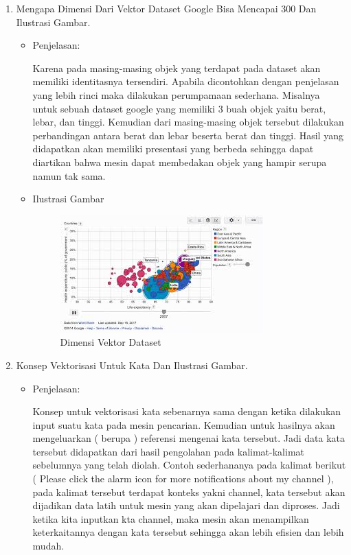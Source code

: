 \begin{enumerate}
\item Mengapa Dimensi Dari Vektor Dataset Google Bisa Mencapai 300 Dan Ilustrasi Gambar.
\begin{itemize}
\item Penjelasan:

Karena pada masing-masing objek yang terdapat pada dataset akan memiliki identitasnya tersendiri. Apabila dicontohkan dengan penjelasan yang lebih rinci maka dilakukan perumpamaan sederhana. Misalnya untuk sebuah dataset google yang memiliki 3 buah objek yaitu berat, lebar, dan tinggi.  Kemudian dari masing-masing objek tersebut dilakukan perbandingan antara berat dan lebar beserta berat dan tinggi. Hasil yang didapatkan akan memiliki presentasi yang berbeda sehingga dapat diartikan bahwa mesin dapat membedakan objek yang hampir serupa namun tak sama.

\item Ilustrasi Gambar

\begin{figure}[!hbtp]
\centering
\includegraphics[scale=0.8]{figures/1174031/5/7.jpg}
\caption{Dimensi Vektor Dataset}
\label{Dimensi Vektor Dataset}
\end{figure}

\end{itemize}

\item Konsep Vektorisasi Untuk Kata Dan Ilustrasi Gambar.
\begin{itemize}
\item  Penjelasan:

Konsep untuk vektorisasi kata sebenarnya sama dengan ketika dilakukan input suatu kata pada mesin pencarian. Kemudian untuk hasilnya akan mengeluarkan ( berupa ) referensi mengenai kata tersebut. Jadi data kata tersebut didapatkan dari hasil pengolahan pada kalimat-kalimat sebelumnya yang telah diolah. Contoh sederhananya pada kalimat berikut ( Please click the alarm icon for more notifications about my channel ), pada kalimat tersebut terdapat konteks yakni channel, kata tersebut akan dijadikan data latih untuk mesin yang akan dipelajari dan diproses. Jadi ketika kita inputkan kta channel, maka mesin akan menampilkan keterkaitannya dengan kata tersebut sehingga akan lebih efisien dan lebih mudah.


\end{itemize}
\end{enumerate}
